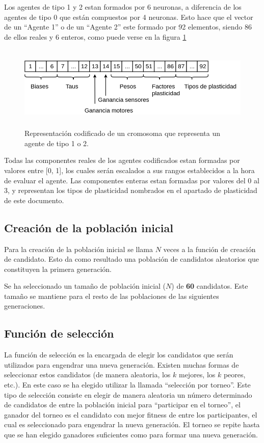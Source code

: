 Los agentes de tipo 1 y 2 estan formados por 6 neuronas, a diferencia de los agentes de tipo 0 que están compuestos por 4 neuronas. Esto hace que el vector de un ``Agente 1'' o de un ``Agente 2'' este formado por 92 elementos, siendo 86 de ellos reales
y 6 enteros, como puede verse en la figura \ref{fig:vector12}

\begin{figure}[H]
	\centering
	\includegraphics[width=1.0\textwidth,height=4cm]{Imagenes/vector12}
	\caption{Representación codificado de un cromosoma que representa un agente de tipo 1 o 2.}
	\label{fig:vector12}
\end{figure}

Todas las componentes reales de los agentes codificados estan formadas por valores entre [0, 1], los cuales serán escalados a sus rangos establecidos a la hora de evaluar el agente. Las componentes enteras estan formadas por valores del 0 al 3, y
representan los tipos de plasticidad nombrados en el apartado de plasticidad de este documento.

\subsection{Creación de la población inicial}
Para la creación de la población inicial se llama $N$ veces a la función de creación de candidato. Esto da como resultado una población de candidatos aleatorios que constituyen la primera generación.

Se ha seleccionado un tamaño de población inicial ($N$) de \textbf{60} candidatos. Este tamaño se mantiene para el resto de las poblaciones de las siguientes generaciones.

\subsection{Función de selección}
La función de selección es la encargada de elegir los candidatos que serán utilizados para engendrar una nueva generación. Existen muchas formas de seleccionar estos candidatos (de manera aleatoria, los $k$ mejores, los $k$ peores, etc.). En este caso
se ha elegido utilizar la llamada ``selección por torneo''. Este tipo de selección consiste en elegir de manera aleatoria un número determinado de candidatos de entre la población inicial para ``participar en el torneo'', el ganador del torneo es el candidato
con mejor fitness de entre los participantes, el cual es seleccionado para engendrar la nueva generación. El torneo se repite hasta que se han elegido ganadores suficientes como para formar una nueva generación.

